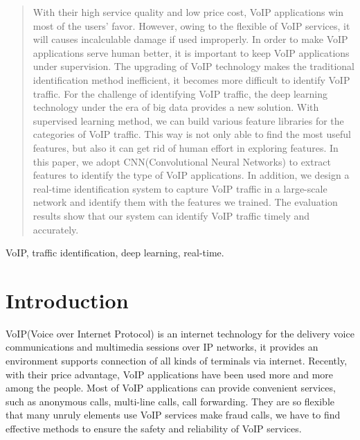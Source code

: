 \documentclass[conference]{IEEEtran}
\begin{document}
\begin{abstract}
  With their high service quality and low price cost, VoIP applications win most of the users' favor. However, owing to the flexible of VoIP services, it will causes incalculable damage if used improperly. In order to make VoIP applications serve human better, it is important to keep VoIP applications under supervision. The upgrading of VoIP technology makes the traditional identification method inefficient, it becomes more difficult to identify VoIP traffic. For the challenge of identifying VoIP traffic, the deep learning technology under the era of big data provides a new solution. With supervised learning method, we can build various feature libraries for the categories of VoIP traffic. This way is not only able to find the most useful features, but also it can get rid of human effort in exploring features. In this paper, we adopt CNN(Convolutional Neural Networks) to extract features to identify the type of VoIP applications. In addition, we design a real-time identification system to capture VoIP traffic in a large-scale network and identify them with the features we trained. The evaluation results show that our system can identify VoIP traffic timely and accurately.

\end{abstract}

\begin{IEEEkeywords}
VoIP, traffic identification, deep learning, real-time.
\end{IEEEkeywords}

\section{Introduction}
\label{intro}
VoIP(Voice over Internet Protocol) is an internet technology for the delivery voice communications and multimedia sessions over IP networks, it provides an environment supports connection of all kinds of terminals via internet. Recently, with their price advantage, VoIP applications have been used more and more among the people. Most of VoIP applications can provide convenient services, such as anonymous calls, multi-line calls, call forwarding. They are so flexible that many unruly elements use VoIP services make fraud calls, we have to find effective methods to ensure the safety and reliability of VoIP services. 
\end{document}
